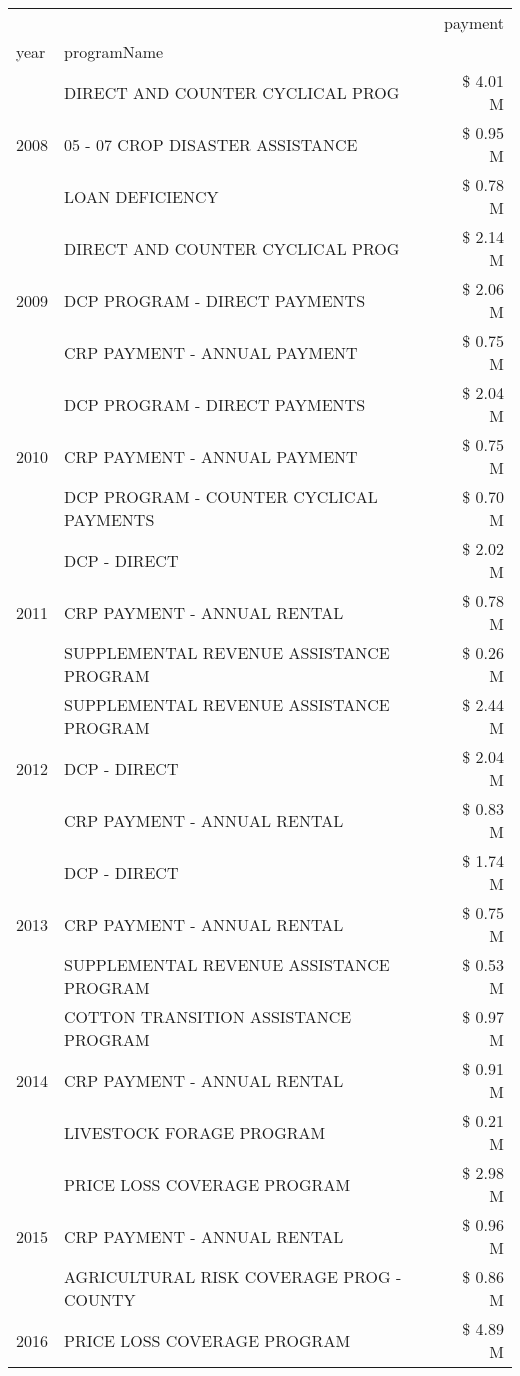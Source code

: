 \begin{tabular}{llr}
\toprule
 &  & payment \\
year & programName &  \\
\midrule
\multirow[t]{3}{*}{2008} & DIRECT AND COUNTER CYCLICAL PROG & \$ 4.01 M \\
 & 05 - 07 CROP DISASTER ASSISTANCE & \$ 0.95 M \\
 & LOAN DEFICIENCY & \$ 0.78 M \\
\cline{1-3}
\multirow[t]{3}{*}{2009} & DIRECT AND COUNTER CYCLICAL PROG & \$ 2.14 M \\
 & DCP PROGRAM - DIRECT PAYMENTS & \$ 2.06 M \\
 & CRP PAYMENT - ANNUAL PAYMENT & \$ 0.75 M \\
\cline{1-3}
\multirow[t]{3}{*}{2010} & DCP PROGRAM - DIRECT PAYMENTS & \$ 2.04 M \\
 & CRP PAYMENT - ANNUAL PAYMENT & \$ 0.75 M \\
 & DCP PROGRAM - COUNTER CYCLICAL PAYMENTS & \$ 0.70 M \\
\cline{1-3}
\multirow[t]{3}{*}{2011} & DCP - DIRECT & \$ 2.02 M \\
 & CRP PAYMENT - ANNUAL RENTAL & \$ 0.78 M \\
 & SUPPLEMENTAL REVENUE ASSISTANCE PROGRAM & \$ 0.26 M \\
\cline{1-3}
\multirow[t]{3}{*}{2012} & SUPPLEMENTAL REVENUE ASSISTANCE PROGRAM & \$ 2.44 M \\
 & DCP - DIRECT & \$ 2.04 M \\
 & CRP PAYMENT - ANNUAL RENTAL & \$ 0.83 M \\
\cline{1-3}
\multirow[t]{3}{*}{2013} & DCP - DIRECT & \$ 1.74 M \\
 & CRP PAYMENT - ANNUAL RENTAL & \$ 0.75 M \\
 & SUPPLEMENTAL REVENUE ASSISTANCE PROGRAM & \$ 0.53 M \\
\cline{1-3}
\multirow[t]{3}{*}{2014} & COTTON TRANSITION ASSISTANCE PROGRAM & \$ 0.97 M \\
 & CRP PAYMENT - ANNUAL RENTAL & \$ 0.91 M \\
 & LIVESTOCK FORAGE PROGRAM & \$ 0.21 M \\
\cline{1-3}
\multirow[t]{3}{*}{2015} & PRICE LOSS COVERAGE PROGRAM & \$ 2.98 M \\
 & CRP PAYMENT - ANNUAL RENTAL & \$ 0.96 M \\
 & AGRICULTURAL RISK COVERAGE PROG - COUNTY & \$ 0.86 M \\
\cline{1-3}
\multirow[t]{3}{*}{2016} & PRICE LOSS COVERAGE PROGRAM                   & \$ 4.89 M \\

\end{tabular}
